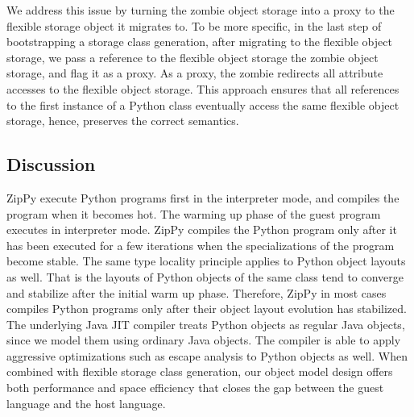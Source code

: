We address this issue by turning the zombie object storage into a proxy to the flexible storage object it migrates to.
To be more specific, in the last step of bootstrapping a storage class generation, after migrating to the flexible object storage, we pass a reference to the flexible object storage the zombie object storage, and flag it as a proxy.
As a proxy, the zombie redirects all attribute accesses to the flexible object storage.
This approach ensures that all references to the first instance of a Python class eventually access the same flexible object storage, hence, preserves the correct semantics.

\subsection{Discussion}

ZipPy execute Python programs first in the interpreter mode, and compiles the program when it becomes hot.
The warming up phase of the guest program executes in interpreter mode.
ZipPy compiles the Python program only after it has been executed for a few iterations when the specializations of the program become stable.
The same type locality principle applies to Python object layouts as well.
That is the layouts of Python objects of the same class tend to converge and stabilize after the initial warm up phase.
Therefore, ZipPy in most cases compiles Python programs only after their object layout evolution has stabilized.
The underlying Java JIT compiler treats Python objects as regular Java objects, since we model them using ordinary Java objects.
The compiler is able to apply aggressive optimizations such as escape analysis to Python objects as well.
When combined with flexible storage class generation, our object model design offers both performance and space efficiency that closes the gap between the guest language and the host language.
